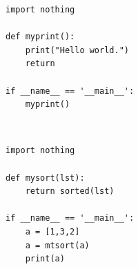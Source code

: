 \documentclass[]{article}
\begin{document}
\newpage


    \begin{lstlisting}
import nothing

def myprint():
    print("Hello world.")
    return
    
if __name__ == '__main__':
    myprint()
    \end{lstlisting}
    
~\\
    \begin{lstlisting}
import nothing

def mysort(lst):
    return sorted(lst)
    
if __name__ == '__main__':
    a = [1,3,2]
    a = mtsort(a)
    print(a)
    \end{lstlisting}
\end{document}

